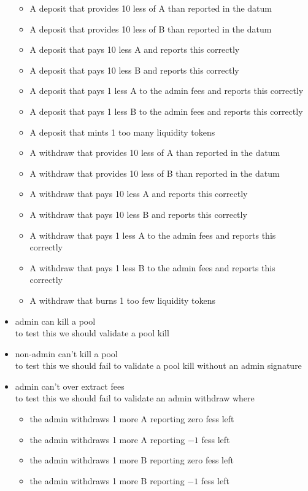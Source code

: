 \documentclass{article}
\begin{document}
\begin{itemize}
\begin{itemize}
				\item A deposit that provides 10 less of A than reported in the datum
				\item A deposit that provides 10 less of B than reported in the datum
				\item A deposit that pays 10 less A and reports this correctly
				\item A deposit that pays 10 less B and reports this correctly
				\item A deposit that pays 1 less A to the admin fees and reports this correctly
				\item A deposit that pays 1 less B to the admin fees and reports this correctly
				\item A deposit that mints 1 too many liquidity tokens
				\item A withdraw that provides 10 less of A than reported in the datum
				\item A withdraw that provides 10 less of B than reported in the datum
				\item A withdraw that pays 10 less A and reports this correctly
				\item A withdraw that pays 10 less B and reports this correctly
				\item A withdraw that pays 1 less A to the admin fees and reports this correctly
				\item A withdraw that pays 1 less B to the admin fees and reports this correctly
				\item A withdraw that burns 1 too few liquidity tokens
			\end{itemize}
	\item admin can kill a pool
		\\ to test this we should validate a pool kill
	\item non-admin can't kill a pool
		\\ to test this we should fail to validate a pool kill without an admin signature
	\item admin can't over extract fees
		\\ to test this we should fail to validate an admin withdraw where
			\begin{itemize}
				\item the admin withdraws 1 more A reporting zero fess left
				\item the admin withdraws 1 more A reporting $-1$ fess left
				\item the admin withdraws 1 more B reporting zero fess left
				\item the admin withdraws 1 more B reporting $-1$ fess left

\end{itemize}
\end{itemize}
\end{document}
